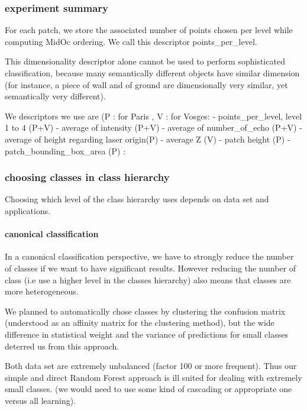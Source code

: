 		\subsubsection{experiment summary}
			For each patch, we store the associated number of points chosen per level while computing MidOc ordering. We call this descriptor points_per_level.
			
			This dimensionality descriptor alone cannot be used to perform sophisticated classification, because many semantically different objects have similar dimension (for instance, a piece of wall and of ground are dimensionally very similar, yet semantically very different).
						
			We descriptors we use are (P : for Paris , V : for Vosges: 
			  - points_per_level, level 1 to 4 (P+V)
			  - average of intensity (P+V)
			  - average of number_of_echo (P+V)
			  - average of height regarding laser origin(P)
			  - average Z (V)
			  - patch height (P)
			  - patch_bounding_box_area (P) : 
			 
		\subsubsection{choosing classes in class hierarchy}
			Choosing which level of the class hierarchy uses depends on data set and applications.
			
			\paragraph{canonical classification}
			
				In a canonical classification perspective, we have to strongly reduce the number of classes if we want to have significant results.
				However reducing the number of class (i.e use a higher level in the classes hierarchy) also means that classes are more heterogeneous.
				
				We planned to automatically chose classes by clustering the confusion matrix (understood as an affinity matrix for the clustering method), but the wide difference in statistical weight and the variance of predictions for small classes deterred us from this approach.
				
				Both data set are extremely unbalanced (factor 100 or more frequent). Thus our simple and direct Random Forest approach is ill suited for dealing with extremely small classes. (we would need to use some kind of cascading or appropriate one versus all learning).
				
